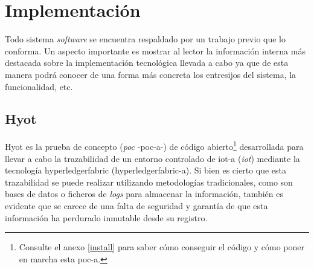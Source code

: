 \documentclass[12pt,a4paper, twoside]{report}
\begin{document}
	\newpage
	
					
	\chapter{Implementación} \label{implementationChapter}
	
	Todo sistema \textit{software} se encuentra respaldado por un trabajo previo que lo conforma. Un aspecto importante es mostrar al lector la información interna más destacada sobre la implementación tecnológica llevada a cabo ya que de esta manera podrá conocer de una forma más concreta los entresijos del sistema, la funcionalidad, etc.
	
	\section{Hyot}
		
	Hyot es la prueba de concepto (\textit{\gls{poc}} -\gls{poc-a}-) de código abierto\footnote{Consulte el anexo \ref{install} para saber cómo conseguir el código y cómo poner en marcha esta \gls{poc-a}.} desarrollada para llevar a cabo la trazabilidad de un entorno controlado de \gls{iot-a} (\textit{\gls{iot}}) mediante la tecnología \gls{hyperledgerfabric} (\gls{hyperledgerfabric-a}). Si bien es cierto que esta trazabilidad se puede realizar utilizando metodologías tradicionales, como son bases de datos o ficheros de \textit{logs} para almacenar la información, también es evidente que se carece de una falta de seguridad y garantía de que esta información ha perdurado inmutable desde su registro. \\
				
\end{document}
